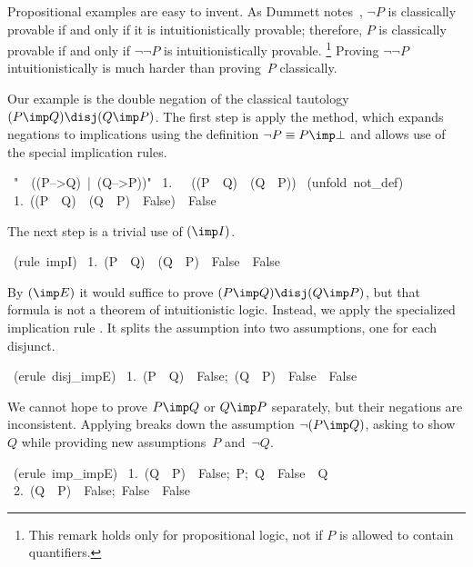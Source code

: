 Propositional examples are easy to invent.  As Dummett notes~\cite[page
28]{dummett}, $\neg P$ is classically provable if and only if it is
intuitionistically provable;  therefore, $P$ is classically provable if and
only if $\neg\neg P$ is intuitionistically provable.%
\footnote{This remark holds only for propositional logic, not if $P$ is
  allowed to contain quantifiers.}
%
Proving $\neg\neg P$ intuitionistically is
much harder than proving~$P$ classically.

Our example is the double negation of the classical tautology $(P\imp
Q)\disj (Q\imp P)$.  The first step is apply the
 method, which expands
negations to implications using the definition $\neg P\equiv P\imp\bot$
and allows use of the special implication rules.
\begin{isabelle}
\ "\isachartilde \ \isachartilde \ ((P-->Q)\ |\ (Q-->P))"\isanewline
\ 1.\ \isasymnot \ \isasymnot \ ((P\ \isasymlongrightarrow \ Q)\ \isasymor \ (Q\ \isasymlongrightarrow \ P))
\isanewline
{}\ (unfold\ not\_def)\isanewline
\ 1.\ ((P\ \isasymlongrightarrow \ Q)\ \isasymor \ (Q\ \isasymlongrightarrow \ P)\ \isasymlongrightarrow \ False)\ \isasymlongrightarrow \ False%
\end{isabelle}
The next step is a trivial use of $(\imp I)$.
\begin{isabelle}
\ (rule\ impI)\isanewline
\ 1.\ (P\ \isasymlongrightarrow \ Q)\ \isasymor \ (Q\ \isasymlongrightarrow \ P)\ \isasymlongrightarrow \ False\ \isasymLongrightarrow \ False%
\end{isabelle}
By $(\imp E)$ it would suffice to prove $(P\imp Q)\disj (Q\imp P)$, but
that formula is not a theorem of intuitionistic logic.  Instead, we
apply the specialized implication rule .  It splits the
assumption into two assumptions, one for each disjunct.
\begin{isabelle}
\ (erule\ disj\_impE)\isanewline
\ 1.\ \isasymlbrakk (P\ \isasymlongrightarrow \ Q)\ \isasymlongrightarrow \ False;\ (Q\ \isasymlongrightarrow \ P)\ \isasymlongrightarrow \ False\isasymrbrakk \ \isasymLongrightarrow \
False
\end{isabelle}
We cannot hope to prove $P\imp Q$ or $Q\imp P$ separately, but
their negations are inconsistent.  Applying  breaks down
the assumption $\neg(P\imp Q)$, asking to show~$Q$ while providing new
assumptions~$P$ and~$\neg Q$.
\begin{isabelle}
\ (erule\ imp\_impE)\isanewline
\ 1.\ \isasymlbrakk (Q\ \isasymlongrightarrow \ P)\ \isasymlongrightarrow \ False;\ P;\ Q\ \isasymlongrightarrow \ False\isasymrbrakk \ \isasymLongrightarrow \ Q\isanewline
\ 2.\ \isasymlbrakk (Q\ \isasymlongrightarrow \ P)\ \isasymlongrightarrow \ False;\ False\isasymrbrakk \ \isasymLongrightarrow \
False
\end{isabelle}
